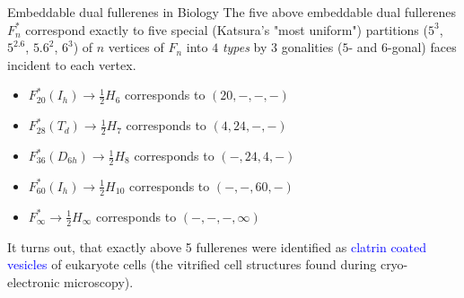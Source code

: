 \documentclass[%
pdf,
colorBG,
slideColor,
]{prosper}
\begin{document}
\begin{slide}{Embeddable dual fullerenes in Biology}
\vspace{-4mm}
The five above embeddable dual fullerenes $F^{*}_n$ correspond exactly to 
five special (Katsura's "most uniform") partitions
($5^3$, $5^2.6$, $5.6^2$, $6^3$) of $n$ vertices of $F_{n}$ 
into $4$ 
{\em types} 
by $3$ gonalities ($5$- and $6$-gonal) faces incident to each vertex.
\begin{itemize}
\item $F^{*}_{20}(I_h)  \to \frac{1}{2}H_{6}$  corresponds to $(20,-,-,-)$
\item $F^{*}_{28}(T_d)  \to \frac{1}{2}H_{7}$  corresponds to $(4,24,-,-)$
\item $F^{*}_{36}(D_{6h})  \to \frac{1}{2}H_{8}$  corresponds to $(-,24,4,-)$
\item $F^{*}_{60}(I_h)  \to \frac{1}{2}H_{10}$  corresponds to $(-,-,60,-)$
\item $F^{*}_{\infty}  \to \frac{1}{2}H_{\infty}$  corresponds to $(-,-,-, 
\infty)$
\end{itemize}
It turns out, that exactly above 5 fullerenes were identified
as \textcolor{blue}{clatrin coated vesicles} of eukaryote cells (the 
vitrified cell structures found during cryo-electronic microscopy).
\end{slide}







\end{document}
